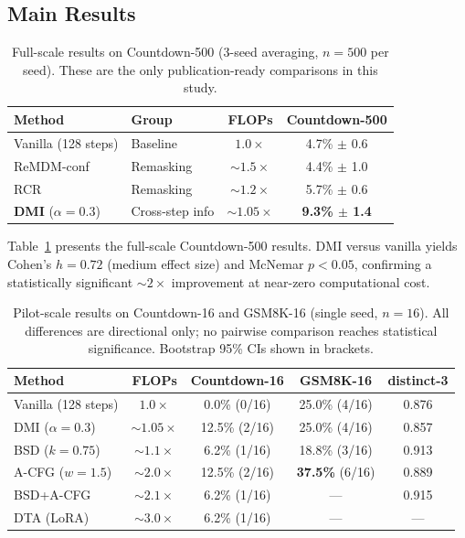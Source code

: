 \documentclass{article}
\begin{document}
\subsection{Main Results}
\label{sec:main_results}

\begin{table}[t]
\caption{Full-scale results on Countdown-500 (3-seed averaging, $n = 500$ per seed). These are the only publication-ready comparisons in this study.}
\label{tab:fullscale}
\centering
\begin{tabular}{llcc}
\toprule
Method & Group & FLOPs & Countdown-500 \\
\midrule
Vanilla (128 steps) & Baseline & $1.0{\times}$ & 4.7\% $\pm$ 0.6 \\
ReMDM-conf & Remasking & ${\sim}1.5{\times}$ & 4.4\% $\pm$ 1.0 \\
RCR & Remasking & ${\sim}1.2{\times}$ & 5.7\% $\pm$ 0.6 \\
\textbf{DMI} ($\alpha{=}0.3$) & Cross-step info & ${\sim}1.05{\times}$ & \textbf{9.3\% $\pm$ 1.4} \\
\bottomrule
\end{tabular}
\end{table}

Table~\ref{tab:fullscale} presents the full-scale Countdown-500 results. DMI versus vanilla yields Cohen's $h = 0.72$ (medium effect size) and McNemar $p < 0.05$, confirming a statistically significant ${\sim}2{\times}$ improvement at near-zero computational cost.

\begin{table}[t]
\caption{Pilot-scale results on Countdown-16 and GSM8K-16 (single seed, $n = 16$). All differences are directional only; no pairwise comparison reaches statistical significance. Bootstrap 95\% CIs shown in brackets.}
\label{tab:pilot}
\centering
\small
\begin{tabular}{lcccc}
\toprule
Method & FLOPs & Countdown-16 & GSM8K-16 & distinct-3 \\
\midrule
Vanilla (128 steps) & $1.0{\times}$ & 0.0\% (0/16) & 25.0\% (4/16) & 0.876 \\
DMI ($\alpha{=}0.3$) & ${\sim}1.05{\times}$ & 12.5\% (2/16) & 25.0\% (4/16) & 0.857 \\
BSD ($k{=}0.75$) & ${\sim}1.1{\times}$ & 6.2\% (1/16) & 18.8\% (3/16) & 0.913 \\
A-CFG ($w{=}1.5$) & ${\sim}2.0{\times}$ & 12.5\% (2/16) & \textbf{37.5\%} (6/16) & 0.889 \\
BSD+A-CFG & ${\sim}2.1{\times}$ & 6.2\% (1/16) & --- & 0.915 \\
DTA (LoRA) & ${\sim}3.0{\times}$ & 6.2\% (1/16) & --- & --- \\
\bottomrule
\end{tabular}
\end{table}
\end{document}
